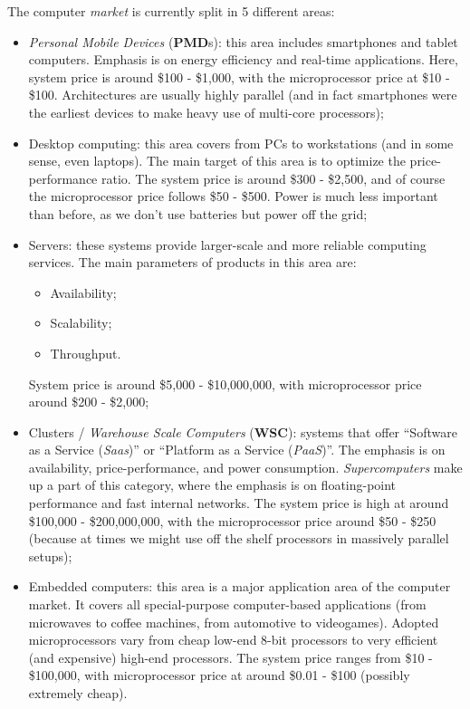 \documentclass[a4paper,11pt]{article}
\begin{document}
The computer \textit{market} is currently split in 5 different areas:
\begin{itemize}
	\item \textit{Personal Mobile Devices} (\textbf{PMD}s): this area includes smartphones and tablet computers. Emphasis is on energy efficiency and real-time applications. Here, system price is around \$100 - \$1,000, with the microprocessor price at \$10 - \$100.
		Architectures are usually highly parallel (and in fact smartphones were the earliest devices to make heavy use of multi-core processors); 
	\item Desktop computing: this area covers from PCs to workstations (and in some sense, even laptops). The main target of this area is to optimize the price-performance ratio. The system price is around \$300 - \$2,500, and of course the microprocessor price follows \$50 - \$500. Power is much less important than before, as we don't use batteries but power off the grid;
	\item Servers: these systems provide larger-scale and more reliable computing services.
		The main parameters of products in this area are:
		\begin{itemize}
\item Availability;
\item Scalability;
\item Throughput.
		\end{itemize}
System price is around \$5,000 - \$10,000,000, with microprocessor price around \$200 - \$2,000;
	\item Clusters / \textit{Warehouse Scale Computers} (\textbf{WSC}): systems that offer “Software as a Service (\textit{Saas})” or “Platform as a Service (\textit{PaaS})”.
The emphasis is on availability, price-performance, and power consumption.
\textit{Supercomputers} make up a part of this category, where the emphasis is on floating-point performance and fast internal networks.
The system price is high at around \$100,000 - \$200,000,000, with the microprocessor price around \$50 - \$250 (because at times we might use off the shelf processors in massively parallel setups);
	\item Embedded computers: this area is a major application area of the computer
market. It covers all special-purpose computer-based applications (from microwaves to coffee machines, from automotive to videogames).
Adopted microprocessors vary from cheap low-end 8-bit processors to very efficient (and expensive) high-end processors.
The system price ranges from \$10 - \$100,000, with microprocessor price at around \$0.01 - \$100 (possibly extremely cheap).


\end{itemize}
\end{document}
